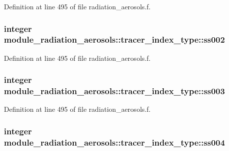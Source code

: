 Definition at line 495 of file radiation\+\_\+aerosols.\+f.

\subsubsection[{\texorpdfstring{ss002}{ss002}}]{\setlength{\rightskip}{0pt plus 5cm}integer module\+\_\+radiation\+\_\+aerosols\+::tracer\+\_\+index\+\_\+type\+::ss002\hspace{0.3cm}{\ttfamily [private]}}\hypertarget{structmodule__radiation__aerosols_1_1tracer__index__type_a9e96ed67b1e072d97314bc9e6e09eee7}{}\label{structmodule__radiation__aerosols_1_1tracer__index__type_a9e96ed67b1e072d97314bc9e6e09eee7}


Definition at line 495 of file radiation\+\_\+aerosols.\+f.

\subsubsection[{\texorpdfstring{ss003}{ss003}}]{\setlength{\rightskip}{0pt plus 5cm}integer module\+\_\+radiation\+\_\+aerosols\+::tracer\+\_\+index\+\_\+type\+::ss003\hspace{0.3cm}{\ttfamily [private]}}\hypertarget{structmodule__radiation__aerosols_1_1tracer__index__type_a5aef8974607bb85ae1a23598a402adfb}{}\label{structmodule__radiation__aerosols_1_1tracer__index__type_a5aef8974607bb85ae1a23598a402adfb}


Definition at line 495 of file radiation\+\_\+aerosols.\+f.

\subsubsection[{\texorpdfstring{ss004}{ss004}}]{\setlength{\rightskip}{0pt plus 5cm}integer module\+\_\+radiation\+\_\+aerosols\+::tracer\+\_\+index\+\_\+type\+::ss004\hspace{0.3cm}{\ttfamily [private]}}\hypertarget{structmodule__radiation__aerosols_1_1tracer__index__type_a88d0024b6f7f6fa3ae4e1da0e9ce7db8}{}\label{structmodule__radiation__aerosols_1_1tracer__index__type_a88d0024b6f7f6fa3ae4e1da0e9ce7db8}


